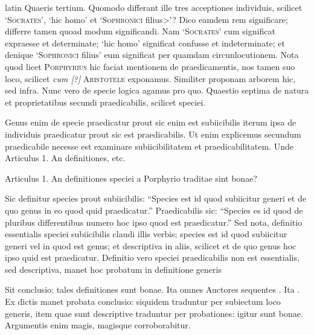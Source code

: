 \begin{otherlanguage*}{latin}
\pstart
Quaeris tertium. Quomodo differant ille tres acceptiones individuis, scilicet `\textsc{Socrates}', `hic homo' et `\textsc{Sophronici} filius>'? Dico eamdem rem significare; differre tamen quoad modum significandi. Nam `\textsc{Socrates}' cum significat expraesse et determinate; `hic homo' significat confusse et indeterminate; et denique `\textsc{Sophronici} filius' eum significat per quamdam circunlocutionem. Nota quod licet \textsc{Porphyrius} hic faciat mentionem de praedicamentis, nos tamen suo loco, scilicet \emph{cum [?]} \textsc{Aristotele} exponamus. Similiter proponam arborem hic, sed infra. Nunc vero de specie logica agamus pro quo. Quaestio septima de natura et proprietatibus secundi praedicabilis, scilicet speciei. 
\pend

\pstart
{}
\pend

\pstart
Genus enim de specie praedicatur prout sic enim est subiicibilis iterum ipsa de individuis praedicatur prout sic est praedicabilis. Ut enim explicemus secundum praedicabile necesse est examinare subiicibilitatem et praedicabilitatem. Unde Articulus 1. An definitiones, etc. 
\pend

\pstart
{}
\pend

\pstart
\noindent%
Articulus 1. An definitiones speciei a Porphyrio traditae sint bonae? 
\pend

\pstart
Sic definitur species prout subiicibilis:
\enquote{Species est id quod subiicitur generi et de quo genus in eo quod quid praedicatur.} Praedicabilis sic:
\enquote{Species es id quod de pluribus differentibus numero hoc ipso quod est praedicatur.} Sed nota, definitio essentialis speciei subiicibilis claudi illis verbis; species est id quod subiicitur generi vel in quod est genus; et descriptiva in aliis, scilicet et de quo genus hoc ipso quid est praedicatur. Definitio vero speciei praedicabilis non est essentialis, sed descriptiva, manet hoc probatum in definitione generis 
\pend

\pstart
Sit conclusio:
tales definitiones sunt bonae. Ita omnes Auctores sequentes . Ita . Ex dictis manet probata conclusio:
siquidem traduntur per subiectum loco generis, item quae sunt descriptive traduntur per probationes:
igitur sunt bonae. Argumentis enim magis, magisque corroborabitur. 
\pend


\end{otherlanguage*}
